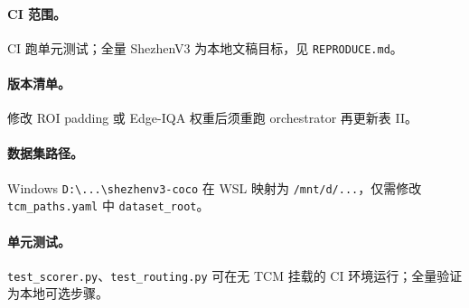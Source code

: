 \paragraph{CI 范围。}
CI 跑单元测试；全量 ShezhenV3 为本地文稿目标，见 \texttt{REPRODUCE.md}。

\paragraph{版本清单。}
修改 ROI padding 或 Edge-IQA 权重后须重跑 orchestrator 再更新表 II。

\paragraph{数据集路径。}
Windows \texttt{D:\textbackslash ...\textbackslash shezhenv3-coco} 在 WSL 映射为 \texttt{/mnt/d/...}，仅需修改 \texttt{tcm\_paths.yaml} 中 \texttt{dataset\_root}。

\paragraph{单元测试。}
\texttt{test\_scorer.py}、\texttt{test\_routing.py} 可在无 TCM 挂载的 CI 环境运行；全量验证为本地可选步骤。
